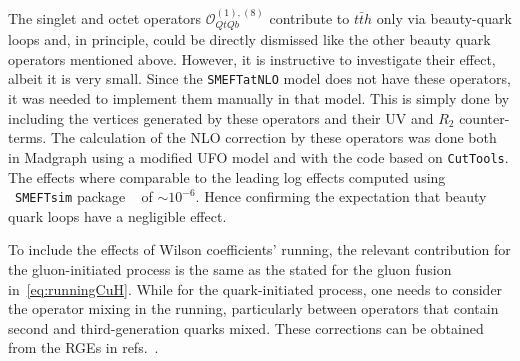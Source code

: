 	\par The singlet and octet operators $\mathcal{O}_{QtQb}^{(1),(8)}$  contribute to $t \bar{t} h$ only via beauty-quark loops and, in principle, could be directly dismissed like the other beauty quark operators mentioned above. However, it is instructive to investigate their effect, albeit it is very small.
	Since the \texttt{SMEFTatNLO} model does not have these operators, it was needed to implement them manually in that model. This is simply done by including the vertices generated by these operators and their UV and $R_2$ counter-terms. The calculation of the NLO correction by these operators was done both in Madgraph using a modified UFO model and with the code based on  \texttt{CutTools}. The effects where comparable to the leading log effects computed using ~\texttt{SMEFTsim} package ~\cite{Brivio:2017btx} of $ \sim 10^{-6}$. Hence confirming the expectation that beauty quark loops have a negligible effect. 
	\par To include the effects of Wilson coefficients' running, the relevant contribution for the gluon-initiated process is the same as the stated for the gluon fusion in~\eqref{eq:runningCuH}. While for the quark-initiated process, one needs to consider the operator mixing in the running, particularly between operators that contain second and third-generation quarks mixed. These corrections can be obtained from the RGEs in refs.~\cite{Jenkins:2013zja,Jenkins:2013wua, Alonso:2013hga}.
